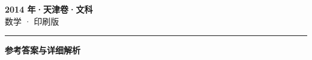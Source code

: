 \documentclass[zihao=5, a4paper]{ctexart}
\begin{document}
\begin{center}
  {\Large\bfseries 2014 年·天津卷·文科}\\[4pt]
  {\large 数学 · 印刷版}
\end{center}
\medskip
{}

\par\bigskip\hrule\bigskip
{}
\Needspace{0.55\textheight}
\begin{center}{\large\bfseries 参考答案与详细解析}\end{center}
\smallskip

\end{document}
